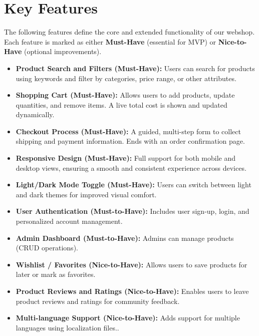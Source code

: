 \documentclass[a4paper,12pt]{article}
\begin{document}
	\section{Key Features}




The following features define the core and extended functionality of our webshop. Each feature is marked as either \textbf{Must-Have} (essential for MVP) or \textbf{Nice-to-Have} (optional improvements).




\begin{itemize}
    \item \textbf{Product Search and Filters (Must-Have):}
    Users can search for products using keywords and filter by categories, price range, or other attributes.


    \item \textbf{Shopping Cart (Must-Have):}
    Allows users to add products, update quantities, and remove items. A live total cost is shown and updated dynamically.


    \item \textbf{Checkout Process (Must-Have):}
    A guided, multi-step form to collect shipping and payment information. Ends with an order confirmation page.


    \item \textbf{Responsive Design (Must-Have):}
    Full support for both mobile and desktop views, ensuring a smooth and consistent experience across devices.


    \item \textbf{Light/Dark Mode Toggle (Must-Have):}
    Users can switch between light and dark themes for improved visual comfort.


    \item \textbf{User Authentication (Must-to-Have):}
    Includes user sign-up, login, and personalized account management.


    \item \textbf{Admin Dashboard (Must-to-Have):}
    Admins can manage products (CRUD operations).








    \item \textbf{Wishlist / Favorites (Nice-to-Have):}
    Allows users to save products for later or mark as favorites.








    \item \textbf{Product Reviews and Ratings (Nice-to-Have):}
    Enables users to leave product reviews and ratings for community feedback.




    \item \textbf{Multi-language Support (Nice-to-Have):}
    Adds support for multiple languages using localization files..


\end{itemize}
\end{document}
